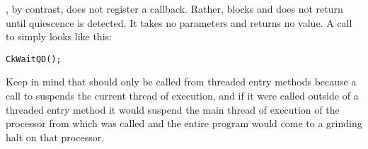 , by contrast, does not register a callback.  Rather,
 blocks and does not return until quiescence is
detected.  It takes no parameters and returns no value.  A call to
 simply looks like this: 

\begin{alltt}
  CkWaitQD();
\end{alltt}

Keep in mind that  should only be called from threaded
entry methods because a call to  suspends the
current thread of execution, and if it were called outside of a threaded entry
method it would suspend the main thread of execution of the processor from
which  was called and the entire program would come to a grinding
halt on that processor.

